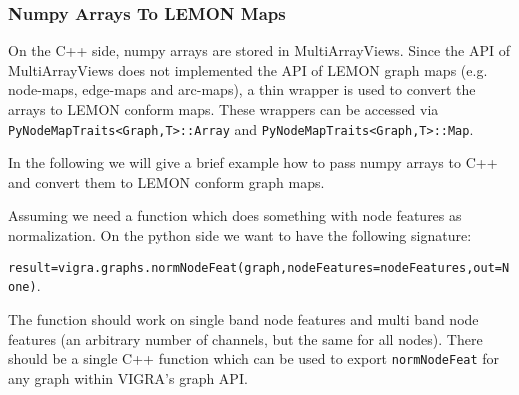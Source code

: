 \subsubsection{Numpy Arrays To LEMON Maps}


On the C++ side, numpy arrays are stored in MultiArrayViews.
Since the API of MultiArrayViews does
not implemented the API  of LEMON graph maps (e.g. node-maps, edge-maps and arc-maps), 
a thin wrapper is used to convert the arrays to LEMON conform maps.
These wrappers can be accessed via \lstinline{PyNodeMapTraits<Graph,T>::Array} and 
\lstinline{PyNodeMapTraits<Graph,T>::Map}. 


In the following we will give a brief example how to pass numpy arrays to C++
and convert them to LEMON conform graph maps.

Assuming we need a function which does something with node features as normalization.
On the python side we want to have the following signature:

\lstinline{result=vigra.graphs.normNodeFeat(graph,nodeFeatures=nodeFeatures,out=None)}.

The function should work on single band node features and multi band node features
(an arbitrary number of channels, but the same for all nodes).
There should be a single C++ function which can be used to export
\lstinline{normNodeFeat} for any graph within VIGRA's graph API. 




